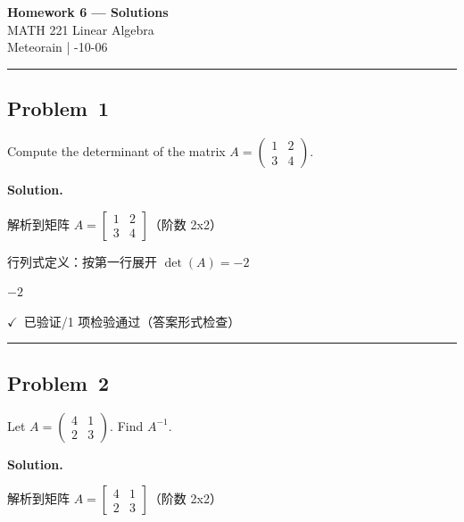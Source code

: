 \documentclass[12pt, a4paper]{article}
\newcommand{\problem}[1]{\subsection*{Problem~#1}}
\newcommand{\solution}{%
  \par\noindent
  {\color{solutiongreen}\bfseries Solution.}\par
}
\newcommand{\verifyok}{\textcolor{solutiongreen}{\ensuremath{\checkmark}\ 已验证}}
\begin{document}
\begin{center}
  {\LARGE\bfseries Homework 6 — Solutions} \\[0.6em]
  {\large\color{solutionblue} MATH 221 Linear Algebra} \\[0.4em]
  Meteorain \quad | -10-06
\end{center}
\vspace{0.5em}\hrule\vspace{1.2em}
\problem{1}

\begin{stepbox}
Compute the determinant of the matrix $A = \begin{pmatrix} 1 & 2 \\ 3 & 4 \end{pmatrix}$.
\end{stepbox}

\solution

\begin{stepbox}
解析到矩阵 $A = \left[\begin{matrix}1 & 2\\3 & 4\end{matrix}\right]$（阶数 2x2）
\end{stepbox}

\begin{stepbox}
行列式定义：按第一行展开 $\det(A) = -2$
\end{stepbox}

\begin{center}
$\boxed{-2}$
\end{center}

\begin{verifybox}\small \verifyok{}/1 项检验通过（答案形式检查） \end{verifybox}

\vspace{0.8em}\hrule\vspace{0.8em}

\problem{2}

\begin{stepbox}
Let $A = \begin{pmatrix} 4 & 1 \\ 2 & 3 \end{pmatrix}$. Find $A^{-1}$.
\end{stepbox}

\solution

\begin{stepbox}
解析到矩阵 $A = \left[\begin{matrix}4 & 1\\2 & 3\end{matrix}\right]$（阶数 2x2）
\end{stepbox}
\end{document}
